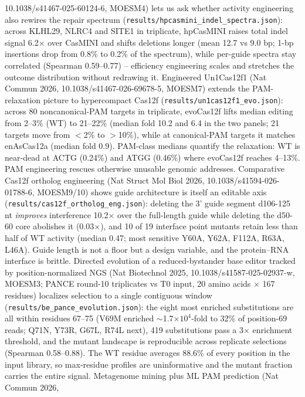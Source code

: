 \documentclass[12pt]{article}
\begin{document}
10.1038/s41467-025-60124-6, MOESM4) lets us ask whether activity
engineering also rewires the repair spectrum
(\texttt{results/hpcasmini\_indel\_spectra.json}): across KLHL29,
NLRC4 and SITE1 in triplicate, hpCasMINI raises total indel signal
6.2$\times$ over CasMINI and shifts deletions longer (mean 12.7 vs
9.0 bp; 1-bp insertions drop from 0.8\% to 0.2\% of the spectrum),
while per-guide spectra stay correlated (Spearman 0.59--0.77) --
efficiency engineering scales and stretches the outcome distribution
without redrawing it.
Engineered Un1Cas12f1 (Nat Commun 2026, 10.1038/s41467-026-69678-5,
MOESM7) extends the PAM-relaxation picture to hypercompact Cas12f
(\texttt{results/un1cas12f1\_evo.json}): across 80 noncanonical-PAM
targets in triplicate, evoCas12f lifts median editing from 2--3\%
(WT) to 21--22\% (median fold 10.2 and 6.4 in the two panels; 21
targets move from $<$2\% to $>$10\%), while at canonical-PAM targets
it matches enAsCas12a (median fold 0.9). PAM-class medians quantify
the relaxation: WT is near-dead at ACTG (0.24\%) and ATGG (0.46\%)
where evoCas12f reaches 4--13\%. PAM engineering rescues otherwise
unusable genomic addresses.
Comparative Cas12f ortholog engineering (Nat Struct Mol Biol 2026,
10.1038/s41594-026-01788-6, MOESM9/10) shows guide architecture is
itself an editable axis (\texttt{results/cas12f\_ortholog\_eng.json}):
deleting the 3' guide segment d106-125 nt \emph{improves} interference
10.2$\times$ over the full-length guide while deleting the d50-60 core
abolishes it (0.03$\times$), and 10 of 19 interface point mutants
retain less than half of WT activity (median 0.47; most sensitive
Y60A, Y62A, F112A, R63A, L46A). Guide length is not a floor but a
design variable, and the protein--RNA interface is brittle.
Directed evolution of a reduced-bystander base editor tracked by
position-normalized NGS (Nat Biotechnol 2025,
10.1038/s41587-025-02937-w, MOESM3; PANCE round-10 triplicates vs T0
input, 20 amino acids $\times$ 167 residues) localizes selection to a
single contiguous window (\texttt{results/be\_pance\_evolution.json}):
the eight most enriched substitutions are all within residues 67--75
(V69M enriched $\sim$1.7$\times 10^{4}$-fold to 32\% of position-69
reads; Q71N, Y73R, G67L, R74L next), 419 substitutions pass a 3$\times$
enrichment threshold, and the mutant landscape is reproducible across
replicate selections (Spearman 0.58--0.88). The WT residue averages
88.6\% of every position in the input library, so max-residue profiles
are uninformative and the mutant fraction carries the entire signal.
Metagenome mining plus ML PAM prediction (Nat Commun 2026,
\end{document}
